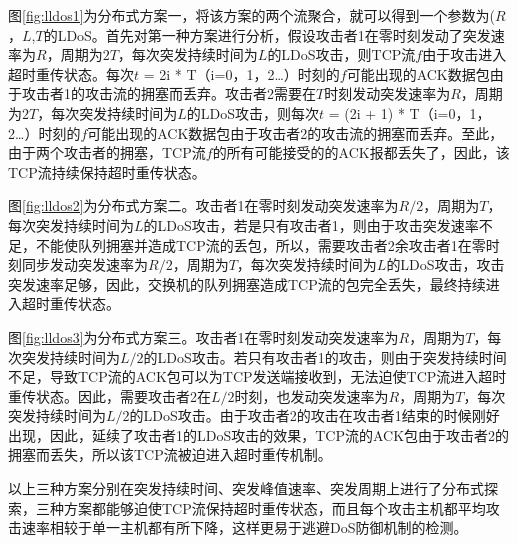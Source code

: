 图\ref{fig:lldos1}为分布式方案一，将该方案的两个流聚合，就可以得到一个参数为($R$，$L$,$T$的LDoS。首先对第一种方案进行分析，假设攻击者1在零时刻发动了突发速率为$R$，周期为$2T$，每次突发持续时间为$L$的LDoS攻击，则TCP流$f$由于攻击进入超时重传状态。每次$t$ = 2i * T（i=0，1，2…）时刻的$f$可能出现的ACK数据包由于攻击者1的攻击流的拥塞而丢弃。攻击者2需要在$T$时刻发动突发速率为$R$，周期为$2T$，每次突发持续时间为$L$的LDoS攻击，则每次$t$ = (2i + 1) * T（i=0，1，2…）时刻的$f$可能出现的ACK数据包由于攻击者2的攻击流的拥塞而丢弃。至此，由于两个攻击者的拥塞，TCP流$f$的所有可能接受的的ACK报都丢失了，因此，该TCP流持续保持超时重传状态。


图\ref{fig:lldos2}为分布式方案二。攻击者1在零时刻发动突发速率为$R/2$，周期为$T$，每次突发持续时间为$L$的LDoS攻击，若是只有攻击者1，则由于攻击突发速率不足，不能使队列拥塞并造成TCP流的丢包，所以，需要攻击者2余攻击者1在零时刻同步发动突发速率为$R/2$，周期为$T$，每次突发持续时间为$L$的LDoS攻击，攻击突发速率足够，因此，交换机的队列拥塞造成TCP流的包完全丢失，最终持续进入超时重传状态。


图\ref{fig:lldos3}为分布式方案三。攻击者1在零时刻发动突发速率为$R$，周期为$T$，每次突发持续时间为$L/2$的LDoS攻击。若只有攻击者1的攻击，则由于突发持续时间不足，导致TCP流的ACK包可以为TCP发送端接收到，无法迫使TCP流进入超时重传状态。因此，需要攻击者2在$L/2$时刻，也发动突发速率为$R$，周期为$T$，每次突发持续时间为$L/2$的LDoS攻击。由于攻击者2的攻击在攻击者1结束的时候刚好出现，因此，延续了攻击者1的LDoS攻击的效果，TCP流的ACK包由于攻击者2的拥塞而丢失，所以该TCP流被迫进入超时重传机制。

以上三种方案分别在突发持续时间、突发峰值速率、突发周期上进行了分布式探索，三种方案都能够迫使TCP流保持超时重传状态，而且每个攻击主机都平均攻击速率相较于单一主机都有所下降，这样更易于逃避DoS防御机制的检测。

